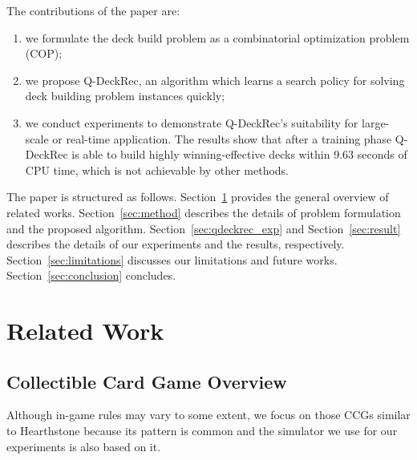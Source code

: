 The contributions of the paper are:
\begin{enumerate}
    \item we formulate the deck build problem as a combinatorial optimization problem (COP);
    \item we propose Q-DeckRec, an algorithm which learns a search policy for solving deck building problem instances quickly;
    \item we conduct experiments to demonstrate Q-DeckRec's suitability for large-scale or real-time application. The results show that after a training phase Q-DeckRec is able to build highly winning-effective decks within 9.63 seconds of CPU time, which is not achievable by other methods.
\end{enumerate}

 
The paper is structured as follows. Section~\ref{sec:previous_work} provides the general overview of related works. Section~\ref{sec:method} describes the details of problem formulation and the proposed algorithm. Section~\ref{sec:qdeckrec_exp} and Section~\ref{sec:result} describes the details of our experiments and the results, respectively. Section~\ref{sec:limitations} discusses our limitations and future works. Section~\ref{sec:conclusion} concludes.
 





\section{Related Work}\label{sec:previous_work}

\subsection{Collectible Card Game Overview}
Although in-game rules may vary to some extent, we focus on those CCGs similar to Hearthstone because its pattern is common and the simulator we use for our experiments is also based on it. 

